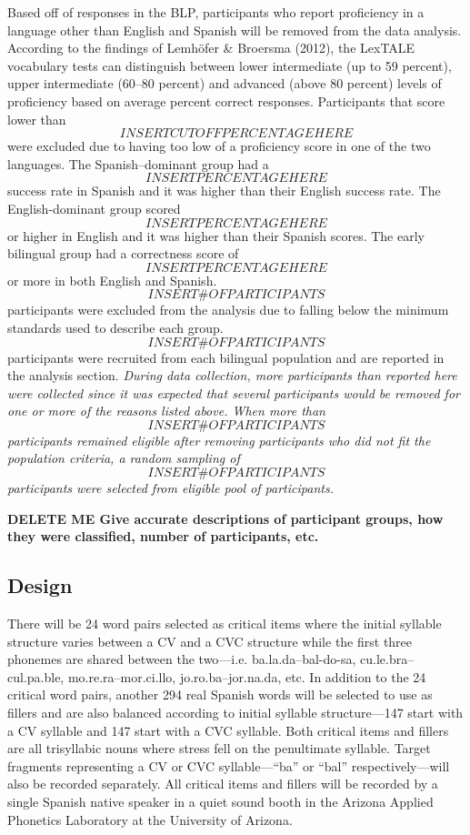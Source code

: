 Based off of responses in the BLP, participants who report proficiency in a language other than English and Spanish will be removed from the data analysis. According to the findings of Lemhöfer \& Broersma (2012), the LexTALE vocabulary tests can distinguish between lower intermediate (up to 59 percent), upper intermediate (60–80 percent) and advanced (above 80 percent) levels of proficiency based on average percent correct responses. Participants that score lower than \[INSERT CUTOFF PERCENTAGE HERE\] were excluded due to having too low of a proficiency score in one of the two languages. The Spanish–dominant group had a  \[INSERT PERCENTAGE HERE\] success rate in Spanish and it was higher than their English success rate. The English-dominant group scored \[INSERT PERCENTAGE HERE\] or higher in English and it was higher than their Spanish scores. The early bilingual group had a correctness score of \[INSERT PERCENTAGE HERE\] or more in both English and Spanish. \[INSERT \# OF PARTICIPANTS\] participants were excluded from the analysis due to falling below the minimum standards used to describe each group. \[INSERT \# OF PARTICIPANTS\]  participants were recruited from each bilingual population and are reported in the analysis section. 
\emph{During data collection, more participants than reported here were collected since it was expected that several participants would be removed for one or more of the reasons listed above. When more than \[INSERT \# OF PARTICIPANTS\] participants remained eligible after removing participants who did not fit the population criteria, a random sampling of \[INSERT \# OF PARTICIPANTS\] participants were selected from eligible pool of participants.}

\textbf{DELETE ME Give accurate descriptions of participant groups, how they were classified, number of participants, etc.}


\subsection{Design}

There will be 24 word pairs selected as critical items where the initial syllable structure varies between a CV and a CVC structure while the first three phonemes are shared between the two—i.e. ba.la.da–bal-do-sa, cu.le.bra–cul.pa.ble, mo.re.ra–mor.ci.llo, jo.ro.ba–jor.na.da, etc. In addition to the 24 critical word pairs, another 294 real Spanish words will be selected to use as fillers and are also balanced according to initial syllable structure—147 start with a CV syllable and 147 start with a CVC syllable. Both critical items and fillers are all trisyllabic nouns where stress fell on the penultimate syllable. Target fragments representing a CV or CVC syllable—“ba” or “bal” respectively—will also be recorded separately. All critical items and fillers will be recorded by a single Spanish native speaker in a quiet sound booth in the Arizona Applied Phonetics Laboratory at the University of Arizona. 

